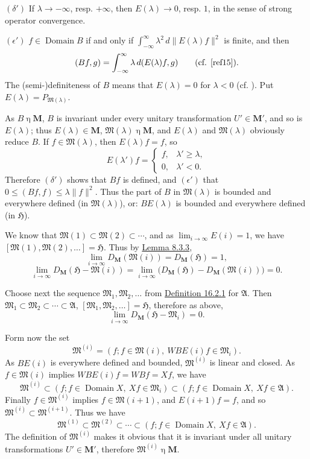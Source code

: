 \documentclass[12pt,b5paper,twoside]{article}
\newcommand{\Hspace}{\mathfrak H}
\newcommand{\M}{\mathbf M}
\newcommand{\defref}[1]{\hyperref[def:#1]{Definition #1}}
\newcommand{\lemref}[1]{\hyperref[lem:#1]{Lemma #1}}
\begin{document}
\noindent\((\delta')\) If \(\lambda\to-\infty\), resp.
\(+\infty\), then \(E(\lambda)\to0\), resp. \(1\), in the sense of strong
operator convergence.

\noindent\((\epsilon')\) \(f\in\operatorname{Domain}B\) if and only if
\(\int_{-\infty}^{\infty}\lambda^2\,d\lVert E(\lambda)f\rVert^2\) is
finite, and then
\[
(Bf,g)=\int_{-\infty}^{\infty}\lambda\,d(E(\lambda)f,g)
\qquad\text{(cf. \cite[p.~92]{ref15}).}
\]
The (semi-)definiteness of \(B\) means that \(E(\lambda)=0\) for
\(\lambda<0\) (cf. \cite[p.~302]{ref21}). Put
\(E(\lambda)=P_{\mathfrak M(\lambda)}\).

As \(B\mathbin\eta\M\), \(B\) is invariant under every unitary
transformation \(U'\in\M'\), and so is \(E(\lambda)\); thus
\(E(\lambda)\in\M\), \(\mathfrak M(\lambda)\mathbin\eta\M\), and
\(E(\lambda)\) and \(\mathfrak M(\lambda)\) obviously reduce \(B\). If
\(f\in\mathfrak M(\lambda)\), then \(E(\lambda)f=f\), so
\[
E(\lambda')f=
\begin{cases}
f,&\lambda'\geq\lambda,\\
0,&\lambda'<0.
\end{cases}
\]
Therefore \((\delta')\) shows that \(Bf\) is defined, and \((\epsilon')\) that
\(0\leq(Bf,f)\leq\lambda\lVert f\rVert^2\). Thus the part of \(B\) in
\(\mathfrak M(\lambda)\) is bounded and everywhere defined (in
\(\mathfrak M(\lambda)\)), or: \(BE(\lambda)\) is bounded and everywhere
defined (in \(\Hspace\)).

We know that \(\mathfrak M(1)\subset\mathfrak M(2)\subset\cdots\), and as
\(\lim_{i\to\infty}E(i)=1\), we have
\([\mathfrak M(1),\mathfrak M(2),\allowbreak\ldots]=\Hspace\). Thus by
\lemref{8.3.3},
\[
\lim_{i\to\infty}D_{\M}(\mathfrak M(i))=D_{\M}(\Hspace)=1,
\]
\[
\lim_{i\to\infty}D_{\M}(\Hspace-\mathfrak M(i))
=\lim_{i\to\infty}
 \bigl(D_{\M}(\Hspace)-D_{\M}(\mathfrak M(i))\bigr)=0.
\]

Choose next the sequence \(\mathfrak M_1,\mathfrak M_2,\ldots\) from
\defref{16.2.1} for \(\mathfrak A\). Then
\(\mathfrak M_1\subset\mathfrak M_2\subset\cdots\subset\mathfrak A\),
\([\mathfrak M_1,\mathfrak M_2,\ldots]=\Hspace\), therefore as above,
\[
\lim_{i\to\infty}D_{\M}(\Hspace-\mathfrak M_i)=0.
\]

Form now the set
\[
\mathfrak M^{(i)}=(f;f\in\mathfrak M(i),\ WBE(i)f\in\mathfrak M_i).
\]
As \(BE(i)\) is everywhere defined and bounded, \(\mathfrak M^{(i)}\) is
linear and closed. As \(f\in\mathfrak M(i)\) implies
\(WBE(i)f=WBf=Xf\), we have
\[
\mathfrak M^{(i)}
\subset(f;f\in\operatorname{Domain}X,\ Xf\in\mathfrak M_i)
\subset(f;f\in\operatorname{Domain}X,\ Xf\in\mathfrak A).
\]
Finally \(f\in\mathfrak M^{(i)}\) implies
\(f\in\mathfrak M(i+1)\), and \(E(i+1)f=f\), and so
\(\mathfrak M^{(i)}\subset\mathfrak M^{(i+1)}\). Thus we have
\[
\mathfrak M^{(1)}\subset\mathfrak M^{(2)}\subset\cdots
\subset(f;f\in\operatorname{Domain}X,\ Xf\in\mathfrak A).
\]
The definition of \(\mathfrak M^{(i)}\) makes it obvious that it is invariant
under all unitary transformations \(U'\in\M'\), therefore
\(\mathfrak M^{(i)}\mathbin\eta\M\).
\end{document}
